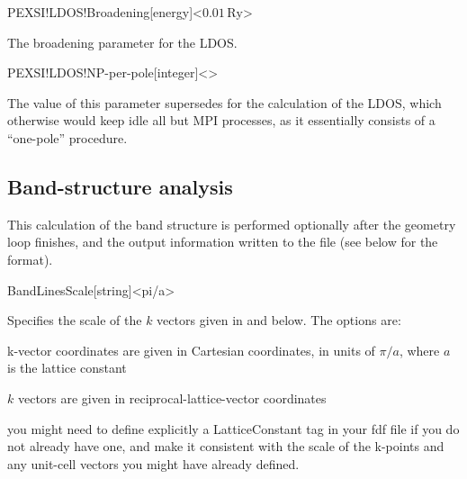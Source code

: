 \begin{fdfentry}{PEXSI!LDOS!Broadening}[energy]<$0.01\,\mathrm{Ry}$>

  The broadening parameter for the LDOS.

\end{fdfentry}

\begin{fdfentry}{PEXSI!LDOS!NP-per-pole}[integer]<>

  The value of this parameter supersedes  for
  the calculation of the LDOS, which otherwise would keep idle all but
   MPI processes, as it essentially consists of
  a ``one-pole'' procedure.

\end{fdfentry}

\subsection{Band-structure analysis}
\label{sec:band-structure}

This calculation of the band structure is performed optionally after
the geometry loop finishes, and the output information written
to the  file (see below for the format).

\begin{fdfentry}{BandLinesScale}[string]<pi/a>
  
  Specifies the scale of the $k$ vectors given in 
  and  below.  The options are:
  \begin{fdfoptions}
    \option[pi/a]%
    k-vector coordinates are given in Cartesian coordinates, in units
    of $\pi/a$, where $a$ is the lattice constant

    \option[ReciprocalLatticeVectors]%
    $k$ vectors are given in reciprocal-lattice-vector coordinates
  \end{fdfoptions}

  \note you might need to define explicitly a LatticeConstant tag in
  your fdf file if you do not already have one, and make it consistent
  with the scale of the k-points and any unit-cell vectors you might
  have already defined.

\end{fdfentry}

